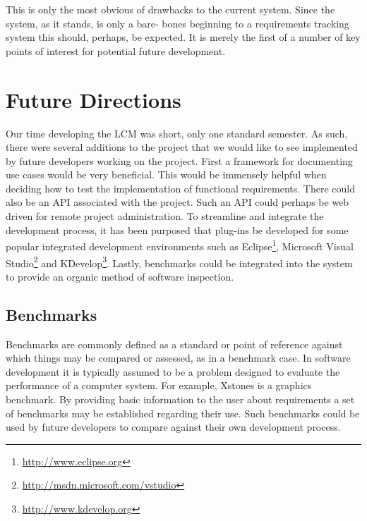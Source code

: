 \documentclass[letterpaper,10pt]{article}
\begin{document}
                This is only the most obvious of drawbacks to the current 
                system.  Since the system, as it stands, is only a bare-
                bones beginning to a requirements tracking system this 
                should, perhaps, be expected.  It is merely the first of a 
                number of key points of interest for potential future 
                development.

    \section{Future Directions}
    \label{sec:future}

    Our time developing the LCM was short, only one standard semester.
    As such, there were several additions to the project that we would
    like to see implemented by future developers working on the
    project.  First a framework for documenting use cases would be
    very beneficial.  This would be immensely helpful when deciding
    how to test the implementation of functional requirements.  There
    could also be an API associated with the project.  Such an API
    could perhaps be web driven for remote project administration. To
    streamline and integrate the development process, it has been
    purposed that plug-ins be developed for some popular integrated
    development environments such as
    Eclipse\footnote{\url{http://www.eclipse.org}}, Microsoft Visual
    Studio\footnote{\url{http://msdn.microsoft.com/vstudio}} and
    KDevelop\footnote{\url{http://www.kdevelop.org}}.  Lastly,
    benchmarks could be integrated into the system to provide an
    organic method of software inspection.

        \subsection{Benchmarks}

            Benchmarks are commonly defined as a standard or point of 
            reference against which things may be compared or assessed, as 
            in a benchmark case.  In software development it is typically 
            assumed to be a problem designed to evaluate the performance of 
            a computer system.  For example, Xstones is a graphics 
            benchmark.  By providing basic information to the user about 
            requirements a set of benchmarks may be established regarding 
            their use.  Such benchmarks could be used by future developers 
            to compare against their own development process.
\end{document}
